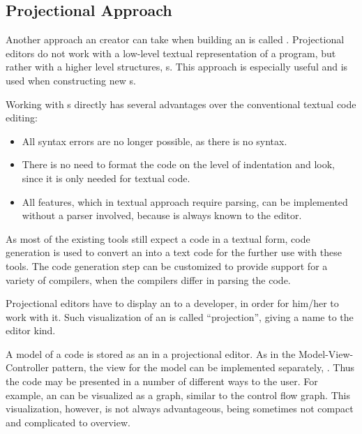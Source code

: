 \subsection{Projectional Approach}

Another approach an  creator can take when building an   is called . 
Projectional editors do not work with a low-level textual representation of a program, but rather with a higher level structures, s.
This approach is especially useful and is used when constructing new s.

Working with s directly has several advantages over the conventional textual code editing:

\begin{itemize}
 \item All syntax errors are no longer possible, as there is no syntax. 
 \item There is no need to format the code on the level of indentation and look, since it is only
needed for textual code.
  \item All features, which in textual approach require parsing, can be implemented without a parser involved, because  is always known to the editor.
\end{itemize}

As most of the existing tools still expect a code in a textual form, code generation is used to
convert an  into a text code for the further use with these tools. The code generation step can be 
customized to provide support for a variety of compilers, when the compilers differ in parsing the code.

Projectional editors have to display an  to a developer, in order for him/her to work with it. Such visualization
of an  is called ``projection'', giving a name to the editor kind.

A model of a code is stored as an  in a projectional editor. As in the Model-View-Controller pattern, the view for
the model can be implemented separately, \cite{GOF95}. Thus the code may be presented in a number of different ways to the user. For example, 
an  can be visualized as a graph, similar to the control flow graph. This visualization, however, is not always advantageous, 
being sometimes not compact and complicated to overview.


